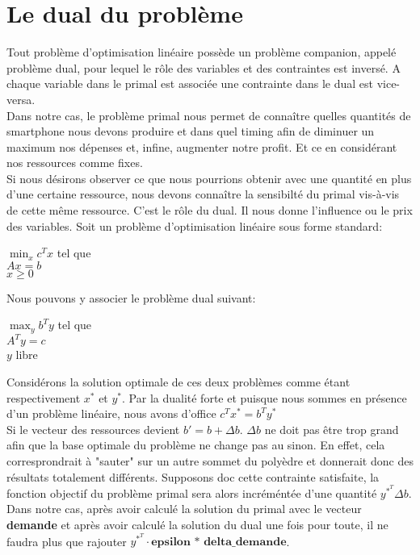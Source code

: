 \documentclass[a4paper,12pt]{article}
\begin{document}
\section{Le dual du problème}
Tout problème d'optimisation linéaire possède un problème companion, appelé problème dual, pour lequel le rôle des variables et des contraintes est inversé. A chaque variable dans le primal est associée une contrainte dans le dual est vice-versa.\\Dans notre cas, le problème primal nous permet de connaître quelles quantités de smartphone nous devons produire et dans quel timing afin de diminuer un maximum nos dépenses et, infine, augmenter notre profit. Et ce en considérant nos ressources comme fixes.\\ Si nous désirons observer ce que nous pourrions obtenir avec une quantité en plus d'une certaine ressource, nous devons connaître la sensibilté du primal vis-à-vis de cette même ressource. C'est le rôle du dual. Il nous donne l'influence ou le prix des variables. Soit un problème d'optimisation linéaire sous forme standard:
\begin{center}
$\min_{x} c^{T}x$ tel que \\$ Ax = b$ \\ $ x \geq 0 $
\end{center}
Nous pouvons y associer le problème dual suivant:
\begin{center}
$\max_{y} b^{T}y$ tel que \\$ A^{T}y = c $ \\ $y$ libre
\end{center} 
Considérons la solution optimale de ces deux problèmes comme étant respectivement $x^{*}$ et $y^{*}$. Par la dualité forte et puisque nous sommes en présence d'un problème linéaire, nous avons d'office $ c^{T}x^{*} = b^{T}y^{*}$\\
Si le vecteur des ressources devient $ b' = b + \Delta b $. $\Delta b$ ne doit pas être trop grand afin que la base optimale du problème ne change pas au sinon. En effet, cela corresprondrait à "sauter" sur un autre sommet du polyèdre et donnerait donc des résultats totalement différents. Supposons doc cette contrainte satisfaite, la fonction objectif du problème primal sera alors incréméntée d'une quantité $y^{*^{T}}\Delta b$. Dans notre cas, après avoir calculé la solution du primal avec le vecteur \textbf{demande} et après avoir calculé la solution du dual une fois pour toute, il ne faudra plus que rajouter $y^{*^{T}} \cdot \textbf{epsilon * delta\_demande}$.
\end{document}
